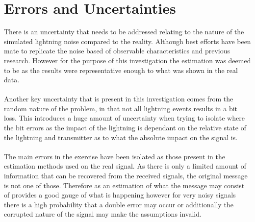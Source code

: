 \section{Errors and Uncertainties}
There is an uncertainty that needs to be addressed relating to the nature of the simulated lightning noise compared to the reality. Although best efforts have been mate to replicate the noise based of observable characteristics and previous research. However for the purpose of this investigation the estimation was deemed to be as the results were representative enough to what was shown in the real data. 
\\\\
Another key uncertainty that is present in this investigation comes from the random nature of the problem, in that not all lightning events results in a bit loss. This introduces a huge amount of uncertainty when trying to isolate where the bit errors as the impact of the lightning is dependant on the relative state of the lightning and transmitter as to what the absolute impact on the signal is.
\\\\
The main errors in the exercise have been isolated as those present in the estimation methods used on the real signal. As there is only a limited amount of information that can be recovered from the received signals, the original message is not one of those. Therefore as an estimation of what the message may consist of provides a good gauge of what is happening however for very noisy signals there is a high probability that a double error may occur or additionally the corrupted nature of the signal may make the assumptions invalid.

